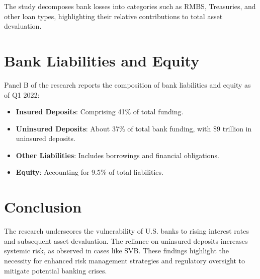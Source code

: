 \documentclass{article}
\begin{document}
The study decomposes bank losses into categories such as RMBS, Treasuries, and other loan types, highlighting their relative contributions to total asset devaluation.

\section{Bank Liabilities and Equity}
Panel B of the research reports the composition of bank liabilities and equity as of Q1 2022:

\begin{itemize}
    \item \textbf{Insured Deposits}: Comprising 41\% of total funding.
    \item \textbf{Uninsured Deposits}: About 37\% of total bank funding, with \$9 trillion in uninsured deposits.
    \item \textbf{Other Liabilities}: Includes borrowings and financial obligations.
    \item \textbf{Equity}: Accounting for 9.5\% of total liabilities.
\end{itemize}

\section{Conclusion}
The research underscores the vulnerability of U.S. banks to rising interest rates and subsequent asset devaluation. The reliance on uninsured deposits increases systemic risk, as observed in cases like SVB. These findings highlight the necessity for enhanced risk management strategies and regulatory oversight to mitigate potential banking crises.
\end{document}
